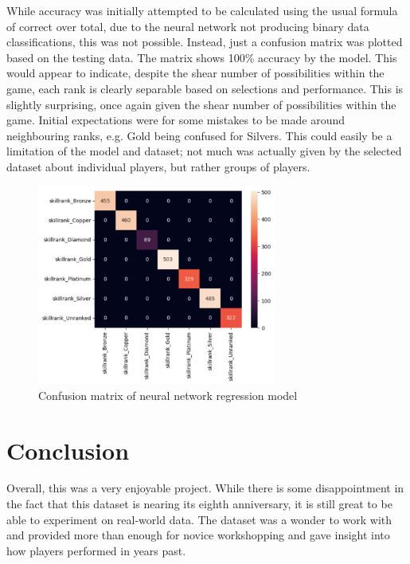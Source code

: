 \documentclass[12pt]{article}
\begin{document}
While accuracy was initially attempted to be calculated using the usual formula of correct over total, due to the neural network not producing binary data classifications, this was not possible.
Instead, just a confusion matrix was plotted based on the testing data.
The matrix shows 100\% accuracy by the model.
This would appear to indicate, despite the shear number of possibilities within the game, each rank is clearly separable based on selections and performance.
This is slightly surprising, once again given the shear number of possibilities within the game.
Initial expectations were for some mistakes to be made around neighbouring ranks, e.g. Gold being confused for Silvers.
This could easily be a limitation of the model and dataset; not much was actually given by the selected dataset about individual players, but rather groups of players.
\begin{figure}[H]
	\centering
	\includegraphics[width=0.7\textwidth]{nn-confusion-matrix}
	\caption{Confusion matrix of neural network regression model}
	\label{fig:nn-confusion-matrix}
\end{figure}

\newpage


\section{Conclusion}
Overall, this was a very enjoyable project.
While there is some disappointment in the fact that this dataset is nearing its eighth anniversary, it is still great to be able to experiment on real-world data.
The dataset was a wonder to work with and provided more than enough for novice workshopping and gave insight into how players performed in years past.
\end{document}
